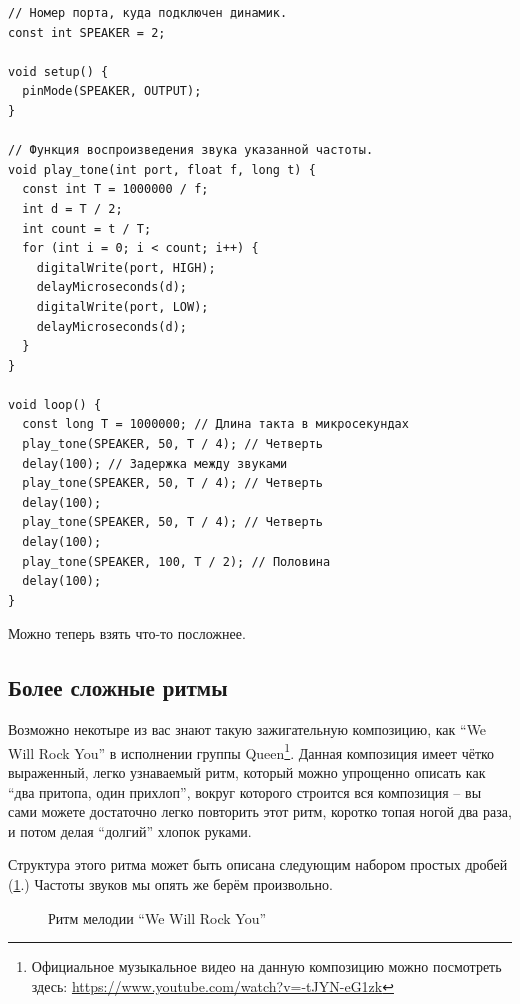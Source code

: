 \documentclass[a4paper,twoside]{book}
\begin{document}
\begin{verbatim}
// Номер порта, куда подключен динамик.
const int SPEAKER = 2;

void setup() {
  pinMode(SPEAKER, OUTPUT);
}

// Функция воспроизведения звука указанной частоты.
void play_tone(int port, float f, long t) {
  const int T = 1000000 / f;
  int d = T / 2;
  int count = t / T;
  for (int i = 0; i < count; i++) {
    digitalWrite(port, HIGH);
    delayMicroseconds(d);
    digitalWrite(port, LOW);
    delayMicroseconds(d);
  }
}

void loop() {
  const long T = 1000000; // Длина такта в микросекундах
  play_tone(SPEAKER, 50, T / 4); // Четверть
  delay(100); // Задержка между звуками
  play_tone(SPEAKER, 50, T / 4); // Четверть
  delay(100);
  play_tone(SPEAKER, 50, T / 4); // Четверть
  delay(100);
  play_tone(SPEAKER, 100, T / 2); // Половина
  delay(100);
}
\end{verbatim}

Можно теперь взять что-то посложнее.

\subsection{Более сложные ритмы}

Возможно некотыре из вас знают такую зажигательную композицию, как ``We Will
Rock You'' в исполнении группы Queen\footnote{Официальное музыкальное видео на
данную композицию можно посмотреть здесь:
\url{https://www.youtube.com/watch?v=-tJYN-eG1zk}}. Данная композиция имеет
чётко выраженный, легко узнаваемый ритм, который можно упрощенно описать как
``два притопа, один прихлоп'', вокруг которого строится вся композиция -- вы сами
можете достаточно легко повторить этот ритм, коротко топая ногой два раза, и
потом делая ``долгий'' хлопок руками.

Структура этого ритма может быть описана следующим набором простых дробей
(\ref{fig:queen-we-will-rock-you-rhythm-1}.) Частоты звуков мы опять же берём
произвольно.

\begin{figure}[ht]
  \label{fig:queen-we-will-rock-you-rhythm-1}
  \caption{Ритм мелодии ``We Will Rock You''}
\end{figure}
\end{document}
